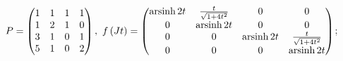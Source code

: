 \begin{enumsolsfull}
		\item \( P = \begin{pmatrix} 1 & 1 & 1 & 1 \\ 1 & 2 & 1 & 0 \\ 3 & 1 & 0 & 1 \\ 5 & 1 & 0 & 2 \end{pmatrix}, ~ f \left( Jt \right) = \begin{pmatrix} \operatorname{arsinh}{2t} & \frac{t}{\sqrt{1 + 4t^2}} & 0 & 0 \\ 0 & \operatorname{arsinh}{2t} & 0 & 0 \\ 0 & 0 & \operatorname{arsinh}{2t} & \frac{t}{\sqrt{1 + 4t^2}} \\ 0 & 0 & 0 & \operatorname{arsinh}{2t} \end{pmatrix} \); %

	\end{enumsolsfull}